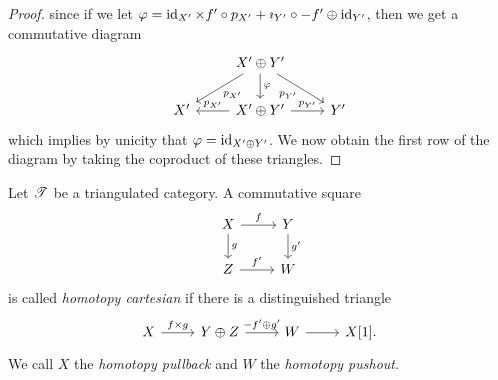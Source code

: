 \documentclass[dissertation.tex]{subfiles}
\begin{document}
\begin{prop}
\begin{proof}
  since if we let $\varphi = \operatorname{id}_{X^\prime} \times f^\prime \circ p_{X^\prime} + \imath_{Y^\prime} \circ -f^\prime \oplus \operatorname{id}_{Y^\prime}$, then
  we get a commutative diagram
  $$\begin{tikzcd}
    & X^\prime \oplus Y^\prime \arrow{ld}{p_{X^\prime}}\arrow[swap]{rd}{p_{Y^\prime}}\arrow{d}{\varphi}\\
    X^\prime & X^\prime \oplus Y^\prime \arrow[swap]{l}{p_{X^\prime}}\arrow{r}{p_{Y^\prime}}& Y^\prime
  \end{tikzcd}$$
  which implies by unicity that $\varphi = \operatorname{id}_{X^\prime \oplus Y^\prime}$.
  We now obtain the first row of the diagram by taking the coproduct of these triangles.
\end{proof}
\end{prop}

\begin{defn}
  Let $\mathscr{T}$ be a triangulated category.
  A commutative square
  $$\begin{tikzcd}
    X \arrow{r}{f}\arrow{d}{g} & Y\arrow{d}{g^\prime}\\
    Z \arrow{r}{f^\prime} & W
  \end{tikzcd}$$
  is called {\it homotopy cartesian} if there is a distinguished triangle
  $$\begin{tikzcd}
    X \arrow{r}{f \times g} & Y \oplus Z \arrow{r}{-f^\prime \oplus g^\prime} & W \arrow{r} & X[1].
  \end{tikzcd}$$
  We call $X$ the {\it homotopy pullback} and $W$ the {\it homotopy pushout}.
\end{defn}
\end{document}
